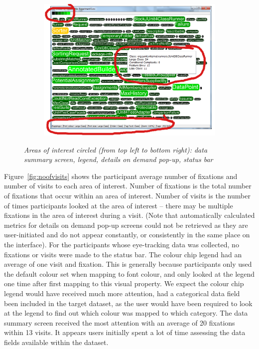 \begin{figure}[!htb]
\begin{subfigure}{.4\textwidth}
\end{subfigure}%
\begin{subfigure}{.6\textwidth}
	\centering
 \includegraphics[scale=0.27]{visualencodingcircled.png}
\end{subfigure}
  \caption{\textit{Areas of interest circled (from top left to bottom right): data summary screen, legend, details on demand pop-up, status bar}}
\label{fig:visualencoding}
\end{figure}

Figure~\vref{fig:noofvisits} shows the participant average number of fixations and number of visits to each area of interest. Number of fixations is the total number of fixations that occur within an area of interest. Number of visits is the number of times participants looked at the area of interest -- there may be multiple fixations in the area of interest during a visit. (Note that automatically calculated metrics for details on demand pop-up screens could not be retrieved as they are user-initiated and do not appear constantly, or consistently in the same place on the interface). For the participants whose eye-tracking data was collected, no fixations or visits were made to the status bar. The colour chip legend had an average of one visit and fixation. This is generally because participants only used the default colour set when mapping to font colour, and only looked at the legend one time after first mapping to this visual property. We expect the colour chip legend would have received much more attention, had a categorical data field been included in the target dataset, as the user would have been required to look at the legend to find out which colour was mapped to which category. The data summary screen received the most attention with an average of 20 fixations within 13 visits. It appears users initially spent a lot of time assessing the data fields available within the dataset. 

